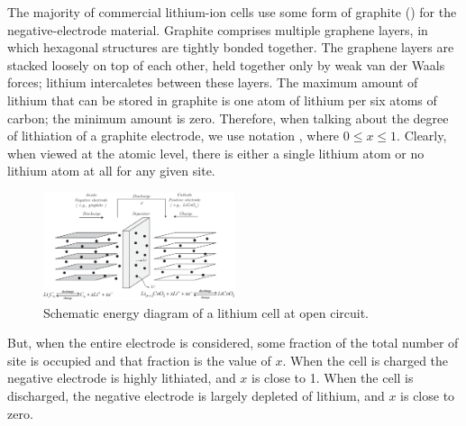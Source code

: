 \documentclass[11pt,a4paper]{article}
\numberwithin{equation}{section}
\theoremstyle{it}
\theoremstyle{definition}
\begin{document}
The majority of commercial lithium-ion cells use some form of graphite () for the negative-electrode material. Graphite comprises multiple graphene layers, in which hexagonal  structures are tightly bonded together. The graphene layers are stacked loosely on top of each other, held together only by weak van der Waals forces; lithium intercaletes between these layers. The maximum amount of lithium that can be stored in graphite is one atom of lithium per six atoms of carbon; the minimum amount is zero. Therefore, when talking about the degree of lithiation of a graphite electrode, we use notation , where $0\le x\le 1$. Clearly, when viewed at the atomic level, there is either a single lithium atom or no lithium atom at all for any given  site.
\begin{figure}[H]
	\centering
	\includegraphics[width = 0.5\textwidth, width = 420pt, angle = 0, keepaspectratio]{figures/lithium_ion_battery/lithium_ion_battery_3.eps}
	\captionsetup{width=0.5\textwidth}		
	\caption{Schematic energy diagram of a lithium cell at open circuit.}
	\label{litium_battery_1}
\end{figure}
But, when the entire electrode is considered, some fraction of the total number of  site is occupied and that fraction is the value of $x$. When the cell is charged the negative electrode is highly lithiated, and $x$ is close to 1. When the cell is discharged, the negative electrode is largely depleted of lithium, and $x$ is close to zero.
\end{document}
